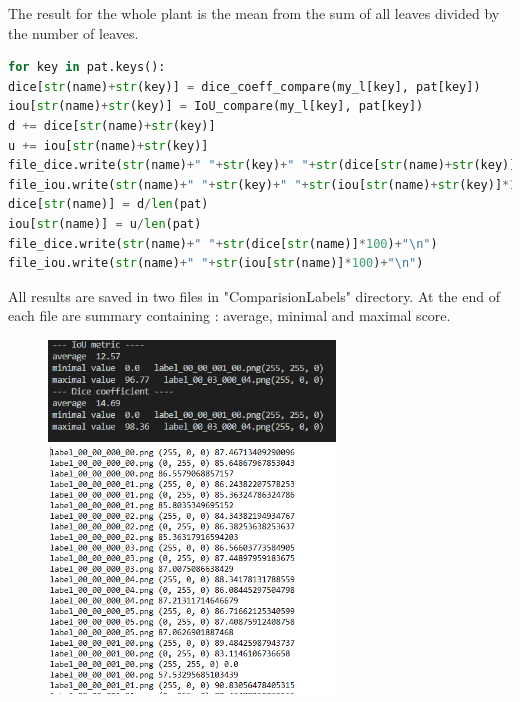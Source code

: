 \documentclass[12pt]{article}
\begin{document}
The result for the whole plant is the mean from the sum of all leaves divided by the number of leaves.

\begin{lstlisting}[language=Python]
for key in pat.keys():
dice[str(name)+str(key)] = dice_coeff_compare(my_l[key], pat[key])
iou[str(name)+str(key)] = IoU_compare(my_l[key], pat[key])
d += dice[str(name)+str(key)]
u += iou[str(name)+str(key)]
file_dice.write(str(name)+" "+str(key)+" "+str(dice[str(name)+str(key)]*100)+"\n")
file_iou.write(str(name)+" "+str(key)+" "+str(iou[str(name)+str(key)]*100)+"\n")
dice[str(name)] = d/len(pat)
iou[str(name)] = u/len(pat)
file_dice.write(str(name)+" "+str(dice[str(name)]*100)+"\n")
file_iou.write(str(name)+" "+str(iou[str(name)]*100)+"\n")
\end{lstlisting}

All results are saved in two files in "ComparisionLabels" directory. At the end of each file are summary containing :  average, minimal and maximal score.

\begin{center}
\begin{figure}[H]
\centering
\includegraphics[width = 3in]{LabelsResults.png}

\includegraphics[width = 3in]{LabelsResults1.png}
\end{figure}
\end{center}
\end{document}
